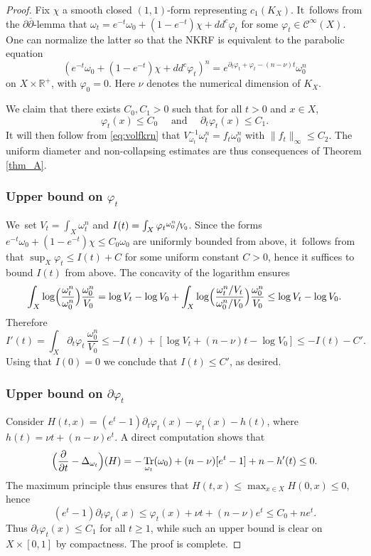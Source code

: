 \documentclass[JEP,XML,SOM,Unicode,published]{cedram}
\DeclareMathOperator{\Tr}{Tr}
\theoremstyle{definition}
\newcommand{\R}{\mathbb R}
\let\f\varphi
\begin{document}
\begin{proof}
Fix $\chi$ a smooth closed $(1,1)$-form representing $c_1(K_X)$. It~follows from the $\partial\overline{\partial}$-lemma
that $\omega_t=e^{-t}\omega_0+(1-e^{-t}) \chi+dd^c \f_t$ for some $\f_t \in {\mathcal C}^{\infty}(X)$. One can normalize
the latter so that the NKRF is equivalent to the parabolic equation
\[
(e^{-t}\omega_0+(1-e^{-t}) \chi+dd^c \f_t)^n=e^{\partial_t \f_t+\f_t-(n-\nu)t} \omega_0^n
\]
on $X \times \R^+$, with $\f_0=0$. Here $\nu$ denotes the numerical dimension of $K_X$.

We claim that there exists $C_0,C_1>0$ such that for all $t>0$ and $x \in X$,
\[
\f_t(x) \leq C_0
\quad \text{ and } \quad
\partial_t \f_t(x) \leq C_1.
\]
It will then follow from \eqref{eq:volfkrn} that $V_{\omega_t}^{-1}\omega_t^n=f_t \omega_0^n$ with
$\|f_t\|_{\infty} \leq C_2$. The uniform diameter and non-collapsing estimates are thus consequences
of Theorem \ref{thm_A}.

\subsubsection*{Upper bound on $\f_t$}
We~set $V_t=\int_X \omega_t^n$ and $I(t)=\int_X \f_t \sfrac{\omega_0^n}{V_0}$.
Since the forms $e^{-t} \omega_0 +(1-e^{-t}) \chi \leq C_0 \omega_0$
are uniformly bounded from above, it~follows from \cite[Prop.\,8.5]{GZbook} that
$\sup_X \f_t \leq I(t)+C$ for some uniform constant $C>0$, hence it suffices to bound
$I(t)$ from above. The concavity of the logarithm ensures
\[
\int_X \log \Bigl( \frac{\omega_t^n}{\omega_0^n} \Bigr) \frac{\omega_0^n}{V_0}
=\log V_t-\log V_0 + \int_X \log \Bigl( \frac{\omega_t^n/V_t}{\omega_0^n/V_0} \Bigr) \frac{\omega_0^n}{V_0}
\leq \log V_t-\log V_0.
\]
Therefore
\[
I'(t)=\int_X \partial_t \f_t\, \frac{\omega_0^n}{V_0} \leq -I(t)+
[\log V_t+(n-\nu)t-\log V_0]\leq -I(t)-C'.
\]
Using that $I(0)=0$ we conclude that $I(t) \leq C'$, as desired.

\subsubsection*{Upper bound on $\partial\f_t$}
Consider $H(t,x)=(e^t-1) \partial_t \f_t(x)-\f_t(x)-h(t)$, where
$h(t)=\nu t+(n-\nu)e^t$. A direct computation shows that
\[
\Bigl( \frac{\partial}{\partial t}-\Delta_{\omega_t} \Bigr)(H)=-\Tr_{\omega_t}(\omega_0)
+(n-\nu)[e^t-1] +n-h'(t) \leq 0.
\]
The maximum principle thus ensures that $H(t,x) \leq \max_{x \in X} H(0,x) \leq 0$, hence
\[
(e^t-1) \partial_t \f_t(x) \leq \f_t(x)+\nu t +(n-\nu)e^t \leq C_0+ne^t.
\]
Thus $\partial_t \f_t(x) \leq C_1$ for all $t \geq 1$, while such an upper bound is
clear on $X \times [0,1]$ by compactness.
The proof is complete.
\end{proof}
\end{document}
